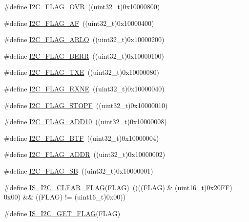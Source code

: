\begin{DoxyCompactItemize}
\item 
\#define \hyperlink{group___i2_c__flags__definition_gab579673c8ac920db199aa7f18e547fb3}{I2\+C\+\_\+\+F\+L\+A\+G\+\_\+\+O\+VR}~((uint32\+\_\+t)0x10000800)
\item 
\#define \hyperlink{group___i2_c__flags__definition_ga2f89dbba9b964e6ade1480705e7a97d4}{I2\+C\+\_\+\+F\+L\+A\+G\+\_\+\+AF}~((uint32\+\_\+t)0x10000400)
\item 
\#define \hyperlink{group___i2_c__flags__definition_gae1e67936f4780e42b8bbe04ac9c20a7b}{I2\+C\+\_\+\+F\+L\+A\+G\+\_\+\+A\+R\+LO}~((uint32\+\_\+t)0x10000200)
\item 
\#define \hyperlink{group___i2_c__flags__definition_ga0454176b6ddd5c402abc3ef5953a21ad}{I2\+C\+\_\+\+F\+L\+A\+G\+\_\+\+B\+E\+RR}~((uint32\+\_\+t)0x10000100)
\item 
\#define \hyperlink{group___i2_c__flags__definition_gaeda14a3e9d02ff20a0d001bba9328f3d}{I2\+C\+\_\+\+F\+L\+A\+G\+\_\+\+T\+XE}~((uint32\+\_\+t)0x10000080)
\item 
\#define \hyperlink{group___i2_c__flags__definition_gad53c5b70a186f699f187c7a641ab0dac}{I2\+C\+\_\+\+F\+L\+A\+G\+\_\+\+R\+X\+NE}~((uint32\+\_\+t)0x10000040)
\item 
\#define \hyperlink{group___i2_c__flags__definition_gacc7d993963e199a6ddba391dab8da896}{I2\+C\+\_\+\+F\+L\+A\+G\+\_\+\+S\+T\+O\+PF}~((uint32\+\_\+t)0x10000010)
\item 
\#define \hyperlink{group___i2_c__flags__definition_ga316c78cbf34b74da96d69f702a0d1444}{I2\+C\+\_\+\+F\+L\+A\+G\+\_\+\+A\+D\+D10}~((uint32\+\_\+t)0x10000008)
\item 
\#define \hyperlink{group___i2_c__flags__definition_ga4dc3d44342007a5cd21c3baa0d938606}{I2\+C\+\_\+\+F\+L\+A\+G\+\_\+\+B\+TF}~((uint32\+\_\+t)0x10000004)
\item 
\#define \hyperlink{group___i2_c__flags__definition_ga5472d1196e934e0cc471aba8f66af416}{I2\+C\+\_\+\+F\+L\+A\+G\+\_\+\+A\+D\+DR}~((uint32\+\_\+t)0x10000002)
\item 
\#define \hyperlink{group___i2_c__flags__definition_gae009ab84be03fcc438625b1c39376ad4}{I2\+C\+\_\+\+F\+L\+A\+G\+\_\+\+SB}~((uint32\+\_\+t)0x10000001)
\item 
\#define \hyperlink{group___i2_c__flags__definition_ga66c8180841350c47627c323acfe42ee9}{I\+S\+\_\+\+I2\+C\+\_\+\+C\+L\+E\+A\+R\+\_\+\+F\+L\+AG}(F\+L\+AG)~((((F\+L\+AG) \& (uint16\+\_\+t)0x20\+F\+F) == 0x00) \&\& ((\+F\+L\+A\+G) != (uint16\+\_\+t)0x00))
\item 
\#define \hyperlink{group___i2_c__flags__definition_ga1a2c2a7c50cd8e33e532918106b4f6ce}{I\+S\+\_\+\+I2\+C\+\_\+\+G\+E\+T\+\_\+\+F\+L\+AG}(F\+L\+AG)
\end{DoxyCompactItemize}


